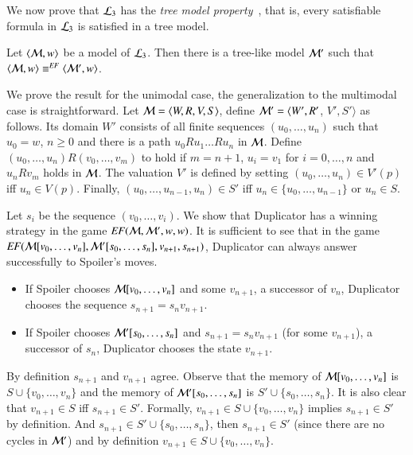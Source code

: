 %

We now prove that $\mathcal{L}_3$ has the \emph{tree model
property}~\cite{BRV01}, that is, every satisfiable formula in
$\mathcal{L}_3$ is satisfied in a tree model.

\begin{thm}\label{prop:tree-model-property}
Let $\langle \mathcal{M},w \rangle$ be a model of $\mathcal{L}_3$. Then there is a tree-like model $\mathcal{M}'$
such that $\langle \mathcal{M},w \rangle\equiv^{\mathit{EF}}\langle \mathcal{M}',w \rangle$.
\end{thm}

\begin{pf}
  We prove the result for the unimodal
case, the generalization to the multimodal case is straightforward.
Let $\mathcal{M}=\langle W,R,V,S \rangle$, define $\mathcal{M}'=\langle W',R'$, $V',S'\rangle$ as follows. Its
domain $W'$ consists of all finite sequences $(u_0,\dots,u_n)$ such
that $u_0=w$, $n\geq 0$ and there is a path $u_0Ru_1\dots Ru_n$ in
$\mathcal{M}$. Define $(u_0,\dots,u_n)R(v_0,\dots,v_m)$ to hold if
$m=n+1$, $u_i=v_1$ for $i=0,\dots,n$ and $u_nRv_m$ holds in
$\mathcal{M}$. The valuation $V'$ is defined by setting
$(u_0,\dots,u_n)\in V'(p)$ iff $u_n\in V(p)$. Finally,
$(u_0,\dots,u_{n-1},u_n)\in S'$ iff $u_n\in\{u_0,\dots,u_{n-1}\}$ or
$u_n\in S$.

Let $s_i$ be the sequence $(v_0,\dots,v_i)$.
We show that Duplicator has a winning strategy in
the game $\mathit{EF}(\mathcal{M},\mathcal{M}',w,w)$. It is sufficient to see that in
the game
$\mathit{EF}(\mathcal{M}[v_0,\dots,v_n],\mathcal{M}'[s_0,\dots,s_n],v_{n+1},s_{n+1})$,
Duplicator can always answer successfully to Spoiler's moves.
\begin{itemize}
\item
If Spoiler chooses $\mathcal{M}[v_0,\dots,v_n]$ and some $v_{n+1}$, a
successor of $v_n$, Duplicator chooses the sequence
$s_{n+1}=s_nv_{n+1}$.

\item
If Spoiler chooses $\mathcal{M}'[s_0,\dots,s_n]$ and $s_{n+1}=s_nv_{n+1}$
(for some $v_{n+1}$), a successor of $s_n$, Duplicator chooses the
state $v_{n+1}$.
\end{itemize}

By definition $s_{n+1}$ and $v_{n+1}$ agree.
Observe that the memory of
$\mathcal{M}[v_0,\dots,v_n]$ is $S \cup \{v_0,\dots,v_n\}$ and the
memory of $\mathcal{M}'[s_0,\dots,s_n]$ is $S' \cup
\{s_0,\dots,s_n\}$. It is also clear that $v_{n+1} \in S$ iff $s_{n+1} \in S'$.
Formally,  $v_{n+1}\in S \cup
\{v_0,\dots,v_n\}$ implies $s_{n+1} \in S'$ by definition. And $s_{n+1}\in S' \cup \{s_0,\dots,s_n\}$, then
$s_{n+1}\in S'$ (since there are no cycles in $\mathcal{M}'$) and by
definition $v_{n+1}\in S \cup \{v_0,\dots,v_n\}$.
\end{pf}

